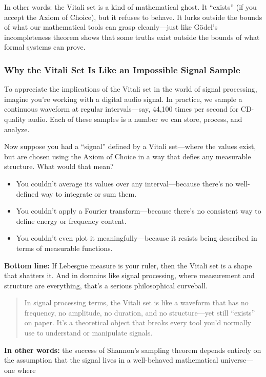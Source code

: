 In other words: the Vitali set is a kind of mathematical ghost. It “exists” (if you accept the Axiom of Choice), but it refuses to behave. It lurks outside the bounds of what our mathematical tools can grasp cleanly—just like Gödel’s incompleteness theorem shows that some truths exist outside the bounds of what formal systems can prove.

\subsubsection{Why the Vitali Set Is Like an Impossible Signal Sample}

To appreciate the implications of the Vitali set in the world of signal processing, imagine you're working with a digital audio signal. In practice, we sample a continuous waveform at regular intervals—say, 44,100 times per second for CD-quality audio. Each of these samples is a number we can store, process, and analyze.

Now suppose you had a “signal” defined by a Vitali set—where the values exist, but are chosen using the Axiom of Choice in a way that defies any measurable structure. What would that mean?

\begin{itemize}
  \item You couldn’t average its values over any interval—because there's no well-defined way to integrate or sum them.
  \item You couldn’t apply a Fourier transform—because there’s no consistent way to define energy or frequency content.
  \item You couldn’t even plot it meaningfully—because it resists being described in terms of measurable functions.
\end{itemize}

\textbf{Bottom line:} If Lebesgue measure is your ruler, then the Vitali set is a shape that shatters it. And in domains like signal processing, where measurement and structure are everything, that’s a serious philosophical curveball.


\begin{quote}
In signal processing terms, the Vitali set is like a waveform that has no frequency, no amplitude, no duration, and no structure—yet still “exists” on paper. It’s a theoretical object that breaks every tool you’d normally use to understand or manipulate signals.
\end{quote}


\textbf{In other words:} the success of Shannon's sampling theorem depends entirely on the assumption that the signal lives in a well-behaved mathematical universe—one where 

